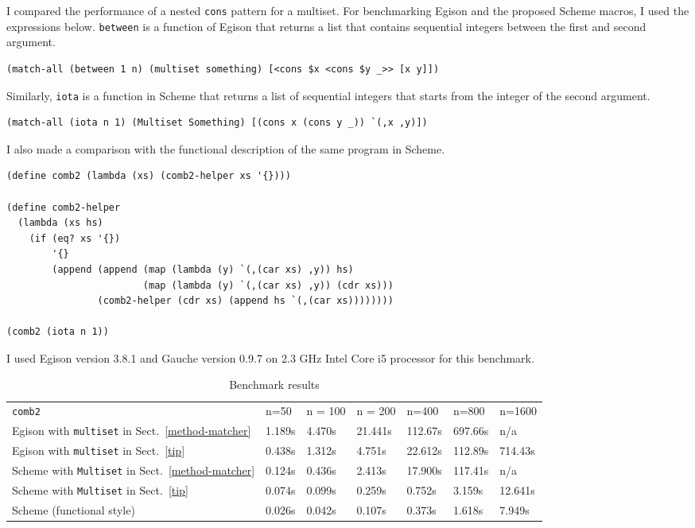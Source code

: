 \documentclass[acmlarge]{acmart}
\newcommand{\new}[1]{\textcolor{blue}{#1}}
\begin{document}
I compared the performance of a nested \texttt{cons} pattern for a multiset.
For benchmarking Egison and the proposed Scheme macros, I used the expressions below.
\texttt{between} is a function of Egison that returns a list that contains sequential integers between the first and second argument.

\begin{lstlisting}[language=egison]
(match-all (between 1 n) (multiset something) [<cons $x <cons $y _>> [x y]])
\end{lstlisting}

\noindent
Similarly, \texttt{iota} is a function in Scheme that returns a list of sequential integers that starts from the integer of the second argument.

\begin{lstlisting}[language=egison]
(match-all (iota n 1) (Multiset Something) [(cons x (cons y _)) `(,x ,y)])
\end{lstlisting}

\noindent
I also made a comparison with the functional description of the same program in Scheme.

\begin{lstlisting}[language=egison]
(define comb2 (lambda (xs) (comb2-helper xs '{})))

(define comb2-helper
  (lambda (xs hs)
    (if (eq? xs '{})
        '{}
        (append (append (map (lambda (y) `(,(car xs) ,y)) hs)
                        (map (lambda (y) `(,(car xs) ,y)) (cdr xs)))
                (comb2-helper (cdr xs) (append hs `(,(car xs))))))))

(comb2 (iota n 1))
\end{lstlisting}

\noindent
I used Egison version 3.8.1 and Gauche version 0.9.7 on 2.3 GHz Intel Core i5 processor for this benchmark.

\begin{table}[htbp]
\begin{tabular}{|l||l|l|l|l|l|l|} \hline
\texttt{comb2} & n=50 & n = 100 & n = 200 & n=400 & n=800 & n=1600 \\ \hhline{|=#=|=|=|=|=|=|}
Egison with \texttt{multiset} in Sect.~\ref{method-matcher} & 1.189s & 4.470s & 21.441s & 112.67s & 697.66s & n/a \\ \hline
Egison with \texttt{multiset} in Sect.~\ref{tip} & 0.438s & 1.312s & 4.751s & 22.612s & 112.89s & 714.43s \\ \hline
Scheme with \texttt{Multiset} in Sect.~\ref{method-matcher} & 0.124s & 0.436s & 2.413s & 17.900s & 117.41s & n/a \\ \hline
Scheme with \texttt{Multiset} in Sect.~\ref{tip} & 0.074s & 0.099s & 0.259s & 0.752s & 3.159s & 12.641s \\ \hline
Scheme (functional style) & 0.026s & 0.042s & 0.107s & 0.373s & 1.618s & 7.949s \\ \hline
\end{tabular}
\caption{Benchmark results}
\label{table:benchmark}
\end{table}
\end{document}
